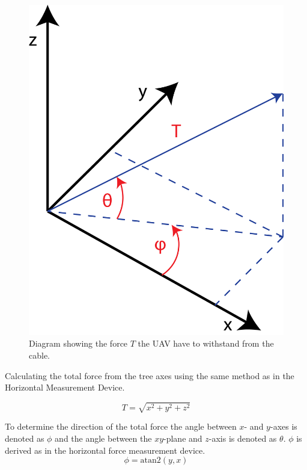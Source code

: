 \begin{figure}[hbtp]
\centering
\includegraphics[scale=0.5]{graphics/UAV-force-diagram.png}
\caption[Force diagram for UAV]{Diagram showing the force $T$ the UAV have to withstand from the cable.}
\end{figure}

\noindent
Calculating the total force from the tree axes using the same method as in the Horizontal Measurement Device.

\begin{equation}
T = \sqrt{x^2+y^2+z^2}
\end{equation} 

\noindent
To determine the direction of the total force the angle between $x$- and $y$-axes is denoted as $\phi$ and the angle between the $xy$-plane and $z$-axis is denoted as $\theta$.
$\phi$ is derived as in the horizontal force measurement device.
\begin{equation}
\phi = \mathrm{atan2}(y,x)
\end{equation}

